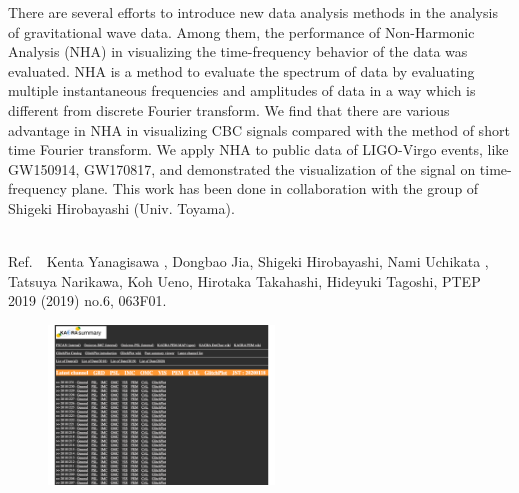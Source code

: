 There are several efforts to introduce new data analysis methods in the analysis of gravitational wave data. 
Among them, the performance of Non-Harmonic Analysis (NHA) in visualizing the time-frequency behavior 
of the data was evaluated. NHA is a method to evaluate the spectrum of data 
by evaluating multiple instantaneous frequencies and amplitudes of data in a way which is different from 
discrete Fourier transform. We find that there are various advantage in NHA in visualizing CBC signals 
compared with the method of short time Fourier transform. We apply NHA to public data of 
LIGO-Virgo events, like GW150914, GW170817, and demonstrated the visualization of the signal 
on time-frequency plane. This work has been done in collaboration with the group of Shigeki Hirobayashi
(Univ. Toyama). 

~\\
\noindent
Ref.~~Kenta Yanagisawa , Dongbao Jia, Shigeki Hirobayashi, Nami Uchikata , Tatsuya Narikawa, Koh Ueno, Hirotaka Takahashi, Hideyuki Tagoshi, PTEP 2019 (2019) no.6, 063F01.

\begin{figure} [hbtp]
\begin{center}
\includegraphics[width=6cm, angle=-90]{astrodiv/gw/das/fig/figdas.pdf}
\caption{\utsm {}}
\label{fig:KAGRA_DA_Sum}
\end{center}
\end{figure}


